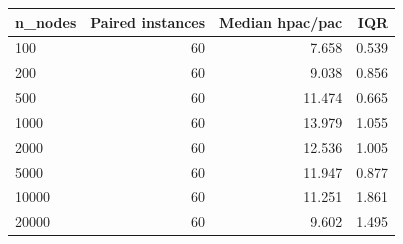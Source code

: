 \begin{tabular}{lrrr}
\toprule
n\_nodes & Paired instances & Median hpac/pac & IQR \\
\midrule
100 & 60 & 7.658 & 0.539 \\
200 & 60 & 9.038 & 0.856 \\
500 & 60 & 11.474 & 0.665 \\
1000 & 60 & 13.979 & 1.055 \\
2000 & 60 & 12.536 & 1.005 \\
5000 & 60 & 11.947 & 0.877 \\
10000 & 60 & 11.251 & 1.861 \\
20000 & 60 & 9.602 & 1.495 \\
\bottomrule
\end{tabular}
